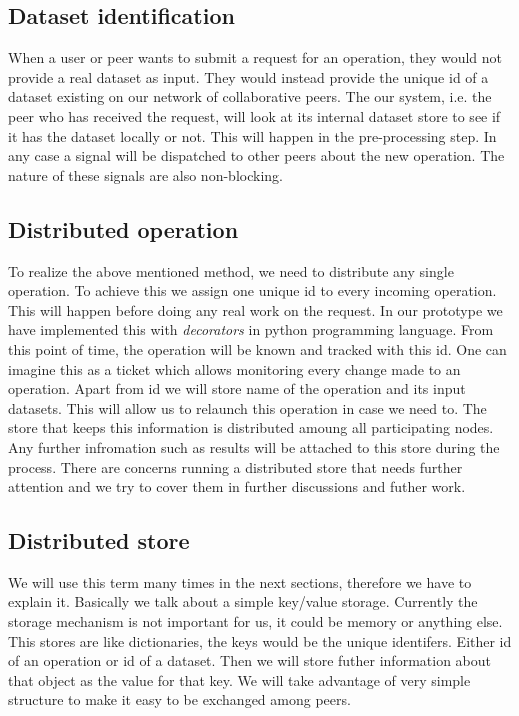 \subsection{Dataset identification}
When a user or peer wants to submit a request for an operation, they would not provide a real dataset as input.
They would instead provide the unique id of a dataset existing on our network of collaborative peers.
The our system, i.e. the peer who has received the request, will look at its internal dataset store to see if it
has the dataset locally or not.
This will happen in the pre-processing step. 
In any case a signal will be dispatched to other peers about the new operation.
The nature of these signals are also non-blocking.

\subsection{Distributed operation}
To realize the above mentioned method, we need to distribute any single operation. To achieve this we assign one unique id
to every incoming operation. This will happen before doing any real work on the request. In our prototype we have implemented
this with \textit{decorators} in python programming language. 
From this point of time, 
the operation will be known and tracked with this id. One can imagine this as a ticket which
allows monitoring every change made to an operation. 
Apart from id we will store name of the operation and its input datasets. 
This will allow us to relaunch this operation in case we need to. 
The store that keeps this information is distributed amoung all participating nodes. 
Any further infromation such as results will be attached to this store during the process. 
There are concerns running a distributed store that needs further attention and 
we try to cover them in further discussions and futher work.

\subsection{Distributed store}
We will use this term many times in the next sections, therefore we have to explain it.
Basically we talk about a simple key/value storage. 
Currently the storage mechanism is not important for us, it could be memory or anything else.
This stores are like dictionaries, the keys would be the unique identifers.
Either id of an operation or id of a dataset. 
Then we will store futher information about that object as the value for that key.
We will take advantage of very simple structure to make it easy to be exchanged among peers.

